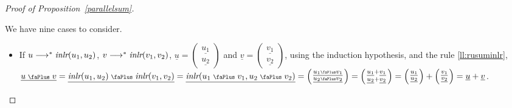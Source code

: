 \documentclass[screen, sigconf,authorversion,nonacm]{acmart}
\theoremstyle{acmdefinition}
\numberwithin{equation}{section}
\newcommand\inlr{\mbox{\it inlr}}
\newcommand\plus{\mathrel{\text{\normalfont\scalebox{0.7}{\faPlus}}}}
\newcommand\lra{\longrightarrow}
\begin{document}
\begin{proof}[Proof of Proposition~\ref{parallelsum}]
\begin{itemize}
      We have nine cases to consider.
      \begin{itemize}
	\item 
	  If  $u \lra^* \inlr(u_1,u_2)$, $v \lra^* \inlr(v_1,v_2)$,
	  $\underline{u} = \left(\begin{smallmatrix}
	      \underline{u_1} \\ \underline{u_2}
	  \end{smallmatrix}\right)$ and 
	  $\underline{v} = \left(\begin{smallmatrix} \underline{v_1} \\ \underline{v_2} 
	  \end{smallmatrix}\right)$, using the induction hypothesis,
	  and the rule \eqref{ll:rusuminlr},
	  $\underline{u \plus v}
	  = \underline{\inlr(u_1,u_2) \plus \inlr(v_1,v_2)}
	  = \underline{\inlr(u_1 \plus v_1,u_2 \plus v_2)}
	  = \left(\begin{smallmatrix} \underline{u_1 \plus v_1} \\
	      \underline{u_2 \plus v_2}
	  \end{smallmatrix}\right)
	  = \left(\begin{smallmatrix} \underline{u_1} + \underline{v_1} \\
	      \underline{u_2} + \underline{v_2}
	  \end{smallmatrix}\right)
	  = \left(\begin{smallmatrix} \underline{u_1} \\
	      \underline{u_2}
	  \end{smallmatrix}\right)
	  +
	  \left(\begin{smallmatrix} \underline{v_1} \\
	      \underline{v_2}
	  \end{smallmatrix}\right)
	  =  \underline{u} + \underline{v}$.


\end{itemize}
\end{itemize}
\end{proof}
\end{document}
